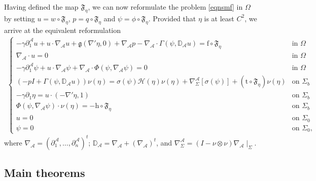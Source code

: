 \documentclass[11pt,letterpaper,reqno]{amsart}
\numberwithin{equation}{section}
\begin{document}
Having defined the map $\mathfrak{F}_{\eta}$, we can now reformulate the problem \eqref{eqnsmf} in $\Omega$ by setting \(u=w \circ \mathfrak{F}_{\eta}\), \(p=q \circ \mathfrak{F}_{\eta}\) and \(\psi=\phi\circ\mathfrak{F}_{\eta}\). Provided that $\eta$ is at least $C^2$, we arrive at the equivalent reformulation
\begin{align} \label{fprsmf}
    \begin{cases}
        -\gamma \partial_{1}^{\mathcal{A}}u + u \cdot \nabla_{\mathcal{A}}u+\mathfrak{g}(\nabla'\eta,0) + \nabla_{\mathcal{A}}p-\nabla_{\mathcal{A}}\cdot \Gamma(\psi,\mathbb{D}_{\mathcal{A}}u)=\mathrm{f}\circ \mathfrak{F}_{\eta}  &\mbox{in \(\Omega\)}\\
        \nabla_{\mathcal{A}} \cdot u = 0 &\mbox{in \(\Omega\)} \\
        -\gamma \partial_{1}^{\mathcal{A}}\psi + u \cdot \nabla_{\mathcal{A}}\psi +\nabla_{\mathcal{A}} \cdot \Phi(\psi,\nabla_{\mathcal{A}}\psi) = 0 &\mbox{in \(\Omega\)} \\
        (-pI+\Gamma(\psi,\mathbb{D}_{\mathcal{A}}u))\nu(\eta) = \sigma(\psi)\mathcal{H}(\eta)\nu(\eta)+\nabla_{\Sigma}^{\mathcal{A}}[\sigma(\psi)]+(\mathrm{t} \circ \mathfrak{F}_{\eta})\nu(\eta) &\mbox{on \(\Sigma_{b}\)} \\
        -\gamma \partial_{1}\eta =u \cdot (-\nabla'\eta,1) &\mbox{on \(\Sigma_{b}\)} \\
        \Phi(\psi,\nabla_{\mathcal{A}}\psi)\cdot\nu(\eta) = -\mathrm{h} \circ \mathfrak{F}_{\eta}  &\mbox{on \(\Sigma_{b}\)} \\
        u = 0 &\mbox{on \(\Sigma_{0}\)} \\
        \psi = 0 &\mbox{on \(\Sigma_{0}\)},
    \end{cases}
\end{align}
where \(\nabla_{\mathcal{A}}=(\partial_{1}^{\mathcal{A}}, \dots, \partial_{n}^{\mathcal{A}})^{t}\); \(\mathbb{D}_{\mathcal{A}}=\nabla_{\mathcal{A}}+(\nabla_{\mathcal{A}})^{t}\), and \(\nabla_{\Sigma}^{\mathcal{A}}=(I-\nu \otimes \nu)\nabla_{\mathcal{A}}\mid_{\Sigma}\).



\subsection{Main theorems}\label{mtps}
\end{document}
